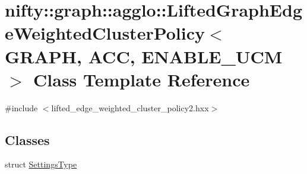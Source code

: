 \hypertarget{classnifty_1_1graph_1_1agglo_1_1LiftedGraphEdgeWeightedClusterPolicy}{}\section{nifty\+:\+:graph\+:\+:agglo\+:\+:Lifted\+Graph\+Edge\+Weighted\+Cluster\+Policy$<$ G\+R\+A\+PH, A\+CC, E\+N\+A\+B\+L\+E\+\_\+\+U\+CM $>$ Class Template Reference}
\label{classnifty_1_1graph_1_1agglo_1_1LiftedGraphEdgeWeightedClusterPolicy}


{\ttfamily \#include $<$lifted\+\_\+edge\+\_\+weighted\+\_\+cluster\+\_\+policy2.\+hxx$>$}

\subsection*{Classes}
\begin{DoxyCompactItemize}
\item 
struct \hyperlink{structnifty_1_1graph_1_1agglo_1_1LiftedGraphEdgeWeightedClusterPolicy_1_1SettingsType}{Settings\+Type}
\end{DoxyCompactItemize}
